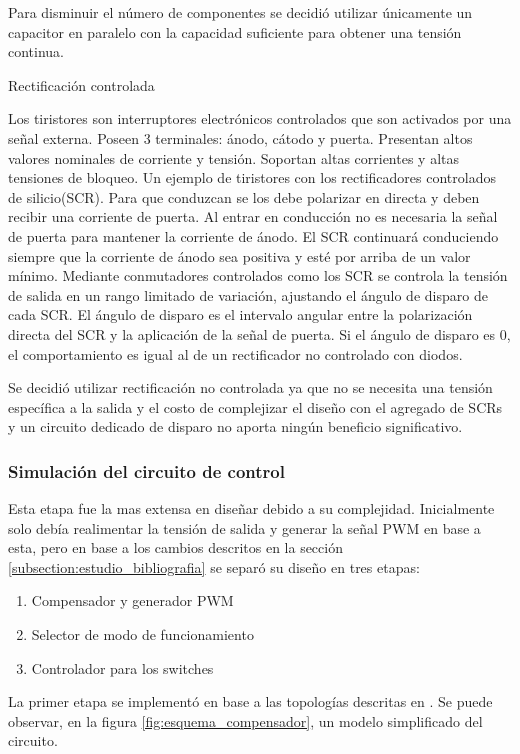 Para disminuir el número de componentes se decidió utilizar únicamente un capacitor en paralelo con la capacidad suficiente para obtener una tensión continua.

Rectificación controlada

Los tiristores son interruptores electrónicos controlados que son activados por una señal externa. 
Poseen 3 terminales: ánodo, cátodo y puerta. Presentan altos valores nominales de corriente y tensión. Soportan altas corrientes y altas tensiones de bloqueo. 
Un ejemplo de tiristores con los rectificadores controlados de silicio(SCR). Para que conduzcan se los debe polarizar en directa y deben recibir una corriente de puerta. 
Al entrar en conducción no es necesaria la señal de puerta para mantener la corriente de ánodo. 
El SCR continuará conduciendo siempre que la corriente de ánodo sea positiva y esté por arriba de un valor mínimo. 
Mediante conmutadores controlados como los SCR se controla la tensión de salida en un rango limitado de variación, ajustando el ángulo de disparo de cada SCR. 
El ángulo de disparo es el intervalo angular entre la polarización directa del SCR y la aplicación de la señal de puerta. 
Si el ángulo de disparo es 0, el comportamiento es igual al de un rectificador no controlado con diodos. 

Se decidió utilizar rectificación no controlada ya que no se necesita una tensión específica a la salida y el costo de complejizar el diseño con el agregado de SCRs y un circuito dedicado de disparo no aporta ningún beneficio significativo.

\subsubsection{Simulación del circuito de control}
Esta etapa fue la mas extensa en diseñar debido a su complejidad. Inicialmente solo debía realimentar la tensión de salida
y generar la señal PWM en base a esta, pero en base a los cambios descritos en la sección \ref{subsection:estudio_bibliografia}
se separó su diseño en tres etapas:

\begin{enumerate}
    \item Compensador y generador PWM
    \item Selector de modo de funcionamiento
    \item Controlador para los switches
\end{enumerate}

La primer etapa se implementó en base a las topologías descritas en \cite{mohan}. Se puede observar,
en la figura \ref{fig:esquema_compensador}, un modelo simplificado del circuito.

